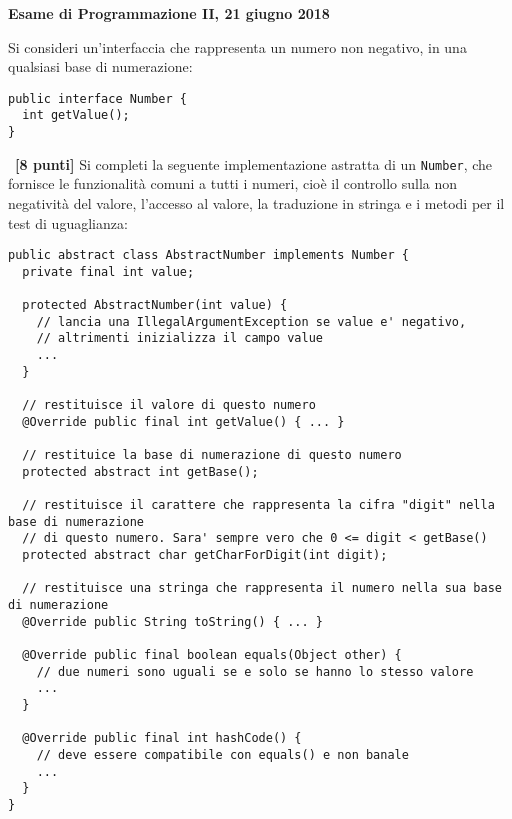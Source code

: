 \documentclass[12pt]{article}
\newcounter{esnu}
\newenvironment{esercizio}{\medskip \noindent {\bf Esercizio\addtocounter{esnu}{1} \arabic{esnu}}}{}
\begin{document}
\begin{center} {\bf Esame di Programmazione II, 21 giugno 2018}\end{center}

Si consideri un'interfaccia che rappresenta un numero non negativo,
in una qualsiasi base di numerazione:
%
\begin{lstlisting}
public interface Number {
  int getValue();
}
\end{lstlisting}

\begin{esercizio}~\textbf{[8 punti]}
Si completi la seguente implementazione astratta
di un \texttt{Number}, che fornisce le funzionalit\`a comuni a tutti i numeri,
cio\`e il controllo sulla non negativit\`a del valore, l'accesso al valore, la traduzione
in stringa e i metodi per il test di uguaglianza:
%
\begin{lstlisting}
public abstract class AbstractNumber implements Number {
  private final int value;

  protected AbstractNumber(int value) {
    // lancia una IllegalArgumentException se value e' negativo,
    // altrimenti inizializza il campo value
    ...
  }

  // restituisce il valore di questo numero
  @Override public final int getValue() { ... }

  // restituice la base di numerazione di questo numero
  protected abstract int getBase();

  // restituisce il carattere che rappresenta la cifra "digit" nella base di numerazione
  // di questo numero. Sara' sempre vero che 0 <= digit < getBase()
  protected abstract char getCharForDigit(int digit);

  // restituisce una stringa che rappresenta il numero nella sua base di numerazione
  @Override public String toString() { ... }

  @Override public final boolean equals(Object other) {
    // due numeri sono uguali se e solo se hanno lo stesso valore
    ...
  }

  @Override public final int hashCode() {
    // deve essere compatibile con equals() e non banale
    ...
  }
}
\end{lstlisting}
\end{esercizio}
\end{document}
